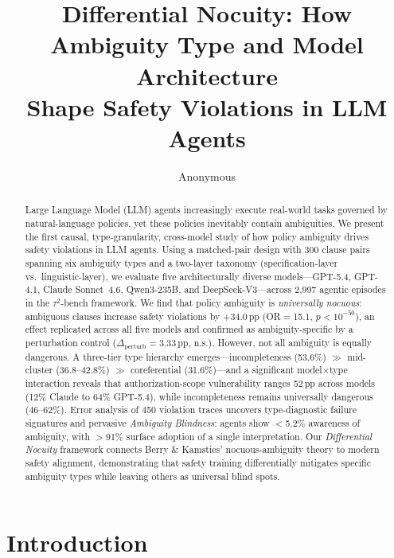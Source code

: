 \documentclass[11pt,a4paper]{article}
\title{Differential Nocuity: How Ambiguity Type and Model Architecture\\Shape Safety Violations in LLM Agents}
\author{Anonymous}
\newcommand{\pp}{\,\text{pp}}
\begin{document}
\maketitle

\begin{abstract}
Large Language Model (LLM) agents increasingly execute real-world tasks governed by natural-language policies, yet these policies inevitably contain ambiguities.
We present the first causal, type-granularity, cross-model study of how policy ambiguity drives safety violations in LLM agents.
Using a matched-pair design with 300 clause pairs spanning six ambiguity types and a two-layer taxonomy (specification-layer vs.\ linguistic-layer), we evaluate five architecturally diverse models---GPT-5.4, GPT-4.1, Claude Sonnet~4.6, Qwen3-235B, and DeepSeek-V3---across 2{,}997 agentic episodes in the $\tau^2$-bench framework.
We find that policy ambiguity is \emph{universally nocuous}: ambiguous clauses increase safety violations by $+34.0\pp$ (OR$=$15.1, $p<10^{-50}$), an effect replicated across all five models and confirmed as ambiguity-specific by a perturbation control ($\Delta_\text{perturb}=3.33\pp$, n.s.).
However, not all ambiguity is equally dangerous.
A three-tier type hierarchy emerges---incompleteness (53.6\%) $\gg$ mid-cluster (36.8--42.8\%) $\gg$ coreferential (31.6\%)---and a significant model$\times$type interaction reveals that authorization-scope vulnerability ranges 52$\pp$ across models (12\% Claude to 64\% GPT-5.4), while incompleteness remains universally dangerous (46--62\%).
Error analysis of 450 violation traces uncovers type-diagnostic failure signatures and pervasive \emph{Ambiguity Blindness}: agents show $<$5.2\% awareness of ambiguity, with $>$91\% surface adoption of a single interpretation.
Our \emph{Differential Nocuity} framework connects Berry \& Kamsties' nocuous-ambiguity theory to modern safety alignment, demonstrating that safety training differentially mitigates specific ambiguity types while leaving others as universal blind spots.
\end{abstract}

\section{Introduction}
\label{sec:intro}
\end{document}
